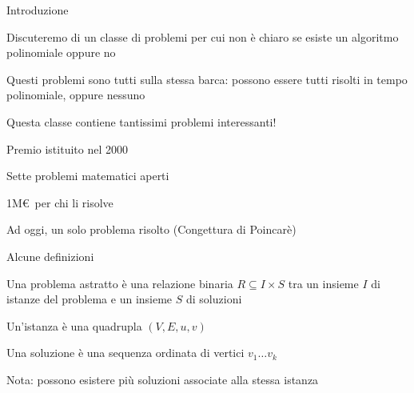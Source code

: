 \begin{frame}{Introduzione}

\vspace{-9pt}
\begin{myboxtitle}
\BIL
\item Discuteremo di un classe di problemi per cui non è chiaro se esiste
un algoritmo polinomiale oppure no
\item Questi problemi sono tutti sulla stessa barca: 
  possono essere tutti risolti in tempo polinomiale, oppure nessuno
\item Questa classe contiene tantissimi problemi interessanti!
\EIL
\end{myboxtitle}

\begin{myboxtitle}
\BI
\item Premio istituito nel 2000
\item Sette problemi matematici aperti
\item 1M\euro\ per chi li risolve
\item Ad oggi, un solo problema risolto (Congettura di Poincarè)
\EI
\end{myboxtitle}

\end{frame}


\begin{frame}{Alcune definizioni}

\vspace{-9pt}
\begin{myboxtitle}
Una \alert{problema astratto} è una relazione binaria $R \subseteq I \times S$
tra un insieme $I$ di istanze del problema e un insieme $S$ di
soluzioni
\end{myboxtitle}

\begin{myboxtitle}
\BIL
\item Un'istanza è una quadrupla $(V,E,u,v)$
\item Una soluzione è una sequenza ordinata di vertici $v_1 \ldots v_k$
\item Nota: possono esistere più soluzioni associate alla stessa istanza
\EIL
\end{myboxtitle}

\end{frame}


